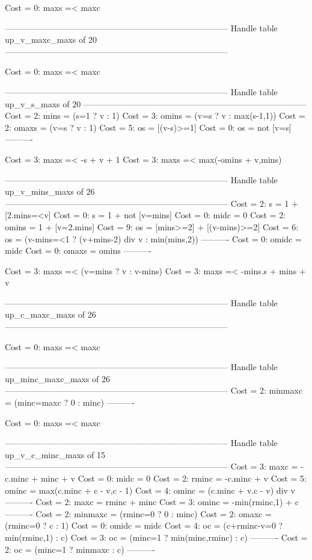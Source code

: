 Cost =  0:  maxs =< maxc

--------------------------------------------------------------------------------
Handle table up_v_maxc_maxs of 20
--------------------------------------------------------------------------------

Cost =  0:  maxs =< maxc

--------------------------------------------------------------------------------
Handle table up_v_s_maxs of 20
--------------------------------------------------------------------------------
Cost =  2:  mins  = (s=1 ? v : 1)
Cost =  3:  omins = (v=s ? v : max(s-1,1))
Cost =  2:  omaxs = (v=s ? v : 1)
Cost =  5:  os    = [(v-s)>=1]
Cost =  0:  os    = not [v=s]
----------

Cost =  3:  maxs =< -s + v + 1
Cost =  3:  maxs =< max(-omins + v,mins)

--------------------------------------------------------------------------------
Handle table up_v_mins_maxs of 26
--------------------------------------------------------------------------------
Cost =  2:  s     = 1 + [2.mins=<v]
Cost =  0:  s     = 1 + not [v=mins]
Cost =  0:  midc  = 0
Cost =  2:  omins = 1 + [v=2.mins]
Cost =  9:  os    = [mins>=2] + [(v-mins)>=2]
Cost =  6:  os    = (v-mins=<1 ? (v+mins-2) div v : min(mins,2))
----------
Cost =  0:  omidc = midc
Cost =  0:  omaxs = omins
----------

Cost =  3:  maxs =< (v=mins ? v : v-mins)
Cost =  3:  maxs =< -mins.s + mins + v

--------------------------------------------------------------------------------
Handle table up_c_maxc_maxs of 26
--------------------------------------------------------------------------------

Cost =  0:  maxs =< maxc

--------------------------------------------------------------------------------
Handle table up_minc_maxc_maxs of 26
--------------------------------------------------------------------------------
Cost =  2:  minmaxc = (minc=maxc ? 0 : minc)
----------

Cost =  0:  maxs =< maxc

--------------------------------------------------------------------------------
Handle table up_v_c_minc_maxs of 15
--------------------------------------------------------------------------------
Cost =  3:  maxc    = -c.minc + minc + v
Cost =  0:  midc    = 0
Cost =  2:  rminc   = -c.minc + v
Cost =  5:  ominc   = max(c.minc + c - v,c - 1)
Cost =  4:  ominc   = (c.minc + v.c - v) div v
----------
Cost =  2:  maxc    = rminc + minc
Cost =  3:  ominc   = -min(rminc,1) + c
----------
Cost =  2:  minmaxc = (rminc=0 ? 0 : minc)
Cost =  2:  omaxc   = (rminc=0 ? c : 1)
Cost =  0:  omidc   = midc
Cost =  4:  oc      = (c+rminc-v=0 ? min(rminc,1) : c)
Cost =  3:  oc      = (minc=1 ? min(minc,rminc) : c)
----------
Cost =  2:  oc      = (minc=1 ? minmaxc : c)
----------

